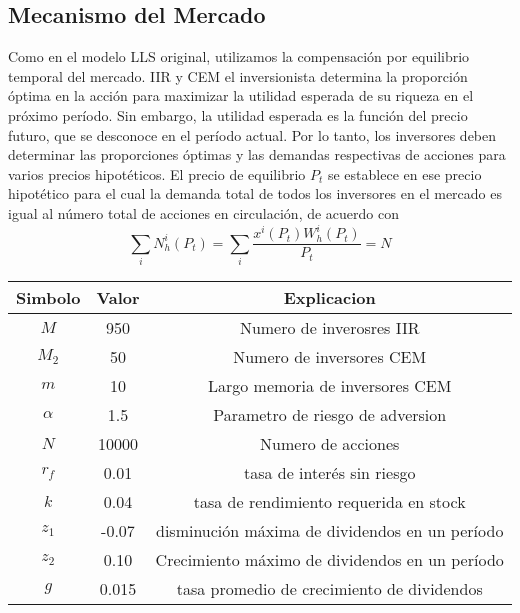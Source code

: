 \documentclass[12pt,a4paper]{article}
\begin{document}
\subsection*{Mecanismo del Mercado}
Como en el modelo LLS original, utilizamos la compensación por equilibrio temporal del mercado. IIR y CEM el inversionista determina la proporción óptima en la acción para maximizar la utilidad esperada de su riqueza en el próximo período. Sin embargo, la utilidad esperada es la función del precio futuro, que se desconoce en el período actual. Por lo tanto, los inversores deben determinar las proporciones óptimas y las demandas respectivas de acciones para varios precios hipotéticos. El precio de equilibrio $P_t$ se establece en ese precio hipotético para el cual la demanda total de todos los inversores en el mercado es igual al número total de acciones en circulación, de acuerdo con
\begin{equation}
\sum_{i}N^{i}_{h}(P_t)=\sum_{i}\frac{x^i(P_t)W^{i}_h(P_t)}{P_t}=N\label{6.10}
\end{equation}
\begin{center}
\begin{tabular}{|c|c|c|}
\hline
Simbolo&Valor&Explicacion\\ 
\hline
$M$&950&Numero de inverosres IIR\\
$M_2$&50&Numero de inversores CEM\\
$m$&10&Largo memoria de inversores CEM\\
$\alpha$&1.5&Parametro de riesgo de adversion\\
$N$&10000&Numero de acciones\\
$r_f$&0.01&tasa de interés sin riesgo\\
$k$&0.04&tasa de rendimiento requerida en stock\\
$z_1$&-0.07&disminución máxima de dividendos en un período\\
$z_2$&0.10&Crecimiento máximo de dividendos en un período\\
$g$&0.015&tasa promedio de crecimiento de dividendos
\end{tabular}\label{Tab6.1}
\end{center}
\end{document}
